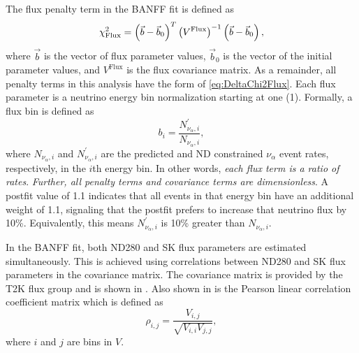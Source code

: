 The flux penalty term in the BANFF fit is defined as
\begin{equation}
\chi_{\text{Flux}}^{2}=\left(\vec{b}-\vec{b}_{0}\right)^{T}\left(V^{\text{Flux}}\right)^{-1}\left(\vec{b}-\vec{b}_{0}\right),\label{eq:DeltaChi2Flux}
\end{equation}
where $\vec{b}$ is the vector of flux parameter values, $\vec{b}_{0}$
is the vector of the initial parameter values, and $V^{\text{Flux}}$
is the flux covariance matrix. As a remainder, all penalty terms in
this analysis have the form of \eqref{eq:DeltaChi2Flux}. Each flux
parameter is a neutrino energy bin normalization starting at one (1).
Formally, a flux bin is defined as 
\begin{equation}
b_{i}=\frac{N_{\nu_{\alpha},i}^{\prime}}{N_{\nu_{\alpha},i}},\label{eq:fluxtermdef}
\end{equation}
where $N_{\nu_{\alpha},i}$ and $N_{\nu_{\alpha},i}^{\prime}$ are
the predicted and ND constrained $\nu_{\alpha}$ event rates, respectively,
in the $i$th energy bin. In other words, \textit{each flux term is
a ratio of rates}. \textit{Further, all penalty terms and covariance
terms are dimensionless}. A postfit value of 1.1 indicates that all
events in that energy bin have an additional weight of 1.1, signaling
that the postfit prefers to increase that neutrino flux by 10\%. Equivalently,
this means $N_{\nu_{\alpha},i}^{\prime}$ is 10\% greater than $N_{\nu_{\alpha},i}$. 

In the BANFF fit, both ND280 and SK flux parameters are estimated
simultaneously. This is achieved using correlations between ND280
and SK flux parameters in the covariance matrix. The covariance matrix
is provided by the T2K flux group and is shown in .
Also shown in  is the
Pearson linear correlation coefficient matrix which is defined as
\begin{equation}
\rho_{i,j}=\frac{V_{i,j}}{\sqrt{V_{i,i}V_{j,j}}},\label{eq:pearson-correlation}
\end{equation}
where $i$ and $j$ are bins in $V$.

